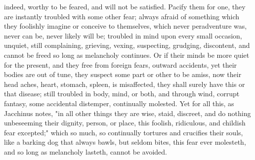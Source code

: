 {indeed, worthy to be feared, and will not be satisfied. Pacify them for one,
they are instantly troubled with some other fear; always afraid of something
which they foolishly imagine or conceive to themselves, which never
peradventure was, never can be, never likely will be; troubled in mind upon
every small occasion, unquiet, still complaining, grieving, vexing, suspecting,
grudging, discontent, and cannot be freed so long as melancholy continues. Or
if their minds be more quiet for the present, and they free from foreign fears,
outward accidents, yet their bodies are out of tune, they suspect some part or
other to be amiss, now their head aches, heart, stomach, spleen, \etc{} is
misaffected, they shall surely have this or that disease; still troubled in
body, mind, or both, and through wind, corrupt fantasy, some accidental
distemper, continually molested. Yet for all this, as
Jacchinus notes, "in all other things they are wise,
staid, discreet, and do nothing unbeseeming their dignity, person, or place,
this foolish, ridiculous, and childish fear excepted;" which so much, so
continually tortures and crucifies their souls, like a barking dog that always
bawls, but seldom bites, this fear ever molesteth, and so long as melancholy
lasteth, cannot be avoided.

}
